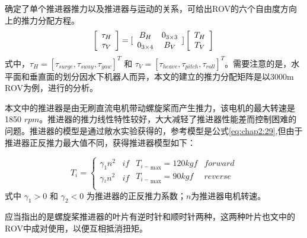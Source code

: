 确定了单个推进器推力以及推进器与运动的关系，可给出ROV的六个自由度方向上的推力分配方程。
\begin{equation}
\label{eq:chap2:thrustconfigure_2}
     \left[ \begin{array}{*{20}{c}}
     \tau_H\\
     \tau_V\\
     \end{array}\right]
      =
     [\begin{array}{*{20}{c}}
     {{B_H}} & {0_{3\times3}}  \\
     {0_{3\times4}} & {{B_V}}  \\
     \end{array}]\left[ {\begin{array}{*{20}{c}}
     {{T_H}}  \\
     {{T_V}}  \\
     \end{array}} \right] \\
\end{equation}
式中，$\tau_H = [\tau_{surge},\tau_{sway},\tau_{yaw}]^T$ 和 $\tau_V=[\tau_{heave},\tau_{pitch},\tau_{roll}]^T$。需要注意的是，水平面和垂直面的划分因水下机器人而异，本文的建立的推力分配矩阵是以3000m ROV为例，进行的分析。

本文中的推进器是由无刷直流电机带动螺旋桨而产生推力，该电机的最大转速是1850 $rpm$。推进器的推力线性特性较好，大大减轻了推进器性能差而控制困难的问题。推进器的模型是通过敞水实验获得的，参考模型是公式\ref{eq:chap2:29},但由于推进器正反推力最大值不同，获得推进器模型如下\cite{wunl2011immune}：

\begin{equation}
\label{eq:8}
{T_i} = \left\{ {\begin{array}{*{20}{c}}
   {{\gamma _1}{n^2}} & {if}  \\
   {{\gamma _{^2}}{n^2}} & {if}  \\
\end{array}} \right.\begin{array}{*{20}{c}}
   {{T_{i - }}_{\max } = 120kgf} & {forward}  \\
   {{T_{i - }}_{\max } = 90kgf } & {reverse}  \\
\end{array}
\end{equation}
式中 $\gamma _1 > 0$ 和 $\gamma _2 < 0$ 为推进器的正反推力系数；$n$为推进器电机转速。

应当指出的是螺旋桨推进器的叶片有逆时针和顺时针两种，这两种叶片也文中的ROV中成对使用，以便互相抵消扭矩。

